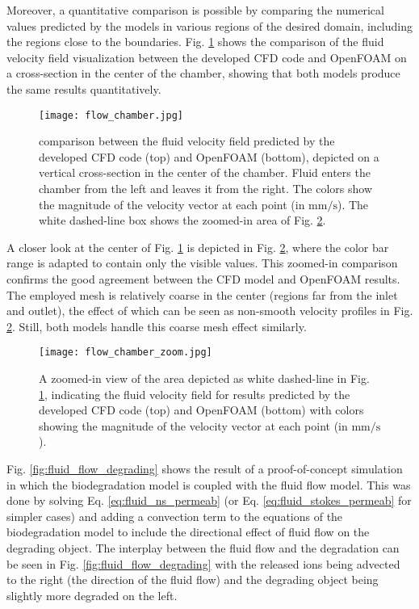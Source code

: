 Moreover, a quantitative comparison is possible by comparing the numerical values predicted by the models in various regions of the desired domain, including the regions close to the boundaries. Fig. \ref{fig:fluid_flow_chamber} shows the comparison of the fluid velocity field visualization between the developed \gls{CFD} code and OpenFOAM on a cross-section in the center of the chamber, showing that both models produce the same results quantitatively.

\begin{figure}[h]
\centering
\medskip
\texttt{[image: flow\_chamber.jpg]}
\caption[Comparing flow field results of developed CFD code and OpenFOAM]{comparison between the fluid velocity field predicted by the developed \gls{CFD} code (top) and OpenFOAM (bottom), depicted on a vertical cross-section in the center of the chamber. Fluid enters the chamber from the left and leaves it from the right. The colors show the magnitude of the velocity vector at each point (in $\mathrm{mm}/\mathrm{s}$). The white dashed-line box shows the zoomed-in area of Fig. \ref{fig:fluid_flow_chamber_zoom}.} \label{fig:fluid_flow_chamber}
\end{figure}

A closer look at the center of Fig. \ref{fig:fluid_flow_chamber} is depicted in Fig. \ref{fig:fluid_flow_chamber_zoom}, where the color bar range is adapted to contain only the visible values. This zoomed-in comparison confirms the good agreement between the \gls{CFD} model and OpenFOAM results. The employed mesh is relatively coarse in the center (regions far from the inlet and outlet), the effect of which can be seen as non-smooth velocity profiles in Fig. \ref{fig:fluid_flow_chamber_zoom}. Still, both models handle this coarse mesh effect similarly.

\begin{figure}[h]
\centering
\medskip
\texttt{[image: flow\_chamber\_zoom.jpg]}
\caption[Comparing flow field results of developed CFD code and OpenFOAM - zoomed-in view]{A zoomed-in view of the area depicted as white dashed-line in Fig. \ref{fig:fluid_flow_chamber}, indicating the fluid velocity field for results predicted by the developed \gls{CFD} code (top) and OpenFOAM (bottom) with colors showing the magnitude of the velocity vector at each point (in $\mathrm{mm}/\mathrm{s}$).} \label{fig:fluid_flow_chamber_zoom}
\end{figure}

Fig. \ref{fig:fluid_flow_degrading} shows the result of a proof-of-concept simulation in which the biodegradation model \cite{Barzegari2021} is coupled with the fluid flow model. This was done by solving Eq. \ref{eq:fluid_ns_permeab} (or Eq. \ref{eq:fluid_stokes_permeab} for simpler cases) and adding a convection term to the equations of the biodegradation model to include the directional effect of fluid flow on the degrading object. The interplay between the fluid flow and the degradation can be seen in Fig. \ref{fig:fluid_flow_degrading} with the released ions being advected to the right (the direction of the fluid flow) and the degrading object being slightly more degraded on the left.

